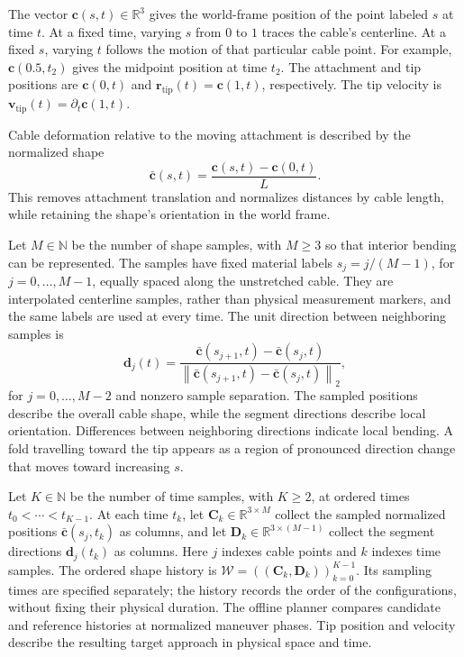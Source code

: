 \documentclass[letterpaper, 10 pt, conference]{ieeeconf}
\newcommand{\edward}[1]{{\color{ForestGreen}#1}}
\begin{document}
The vector $\mathbf{c}(s,t)\in\mathbb{R}^{3}$ gives the
world-frame position of the point labeled $s$ at time $t$.
At a fixed time, varying $s$ from $0$ to $1$ traces the cable's
centerline. At a fixed $s$, varying $t$ follows the motion
of that particular cable point. For example,
$\mathbf{c}(0.5,t_2)$ gives the midpoint position at time $t_2$.
The attachment and tip positions are $\mathbf{c}(0,t)$ and
$\mathbf{r}_{\mathrm{tip}}(t)=\mathbf{c}(1,t)$, respectively.
The tip velocity is
$\mathbf{v}_{\mathrm{tip}}(t)=\partial_t\mathbf{c}(1,t)$.

Cable deformation relative to the moving attachment is described
by the normalized shape
\begin{equation}
\bar{\mathbf{c}}(s,t)
=
\frac{\mathbf{c}(s,t)-\mathbf{c}(0,t)}{L}.
\label{eq:normalized_whip_shape}
\end{equation}
This removes attachment translation and normalizes distances by
cable length, while retaining the shape's orientation in the
world frame.

Let $M\in\mathbb{N}$ be the number of shape samples, with
$M\geq3$ so that interior bending can be represented.
The samples have fixed material labels $s_j=j/(M-1)$,
for $j=0,\ldots,M-1$, equally spaced along the unstretched
cable. They are interpolated centerline samples, rather than
physical measurement markers, and the same labels are used
at every time.
The unit direction between neighboring samples is
\begin{equation}
\mathbf{d}_j(t)
=
\frac{
\bar{\mathbf{c}}(s_{j+1},t)-\bar{\mathbf{c}}(s_j,t)
}{
\left\|
\bar{\mathbf{c}}(s_{j+1},t)-\bar{\mathbf{c}}(s_j,t)
\right\|_2
},
\label{eq:whip_segment_direction}
\end{equation}
for $j=0,\ldots,M-2$ and nonzero sample separation.
The sampled positions describe the overall cable shape, while
the segment directions describe local orientation. Differences
between neighboring directions indicate local bending.
A fold travelling toward the tip appears as a region of
pronounced direction change that moves toward increasing $s$.

Let $K\in\mathbb{N}$ be the number of time samples, with
$K\geq2$, at ordered times $t_0<\cdots<t_{K-1}$.
At each time $t_k$, let
$\mathbf{C}_k\in\mathbb{R}^{3\times M}$ collect the sampled normalized
positions $\bar{\mathbf{c}}(s_j,t_k)$ as columns, and let
$\mathbf{D}_k\in\mathbb{R}^{3\times(M-1)}$ collect the segment directions
$\mathbf{d}_j(t_k)$ as columns.
Here $j$ indexes cable points and $k$ indexes time samples.
The ordered shape history is
$\mathcal{W}=((\mathbf{C}_k,\mathbf{D}_k))_{k=0}^{K-1}$.
Its sampling times are specified separately; the history records
the order of the configurations, without fixing their physical
duration. The offline planner compares candidate and reference
histories at normalized maneuver phases. Tip position and velocity
describe the resulting target approach in physical space and time.
\end{document}
